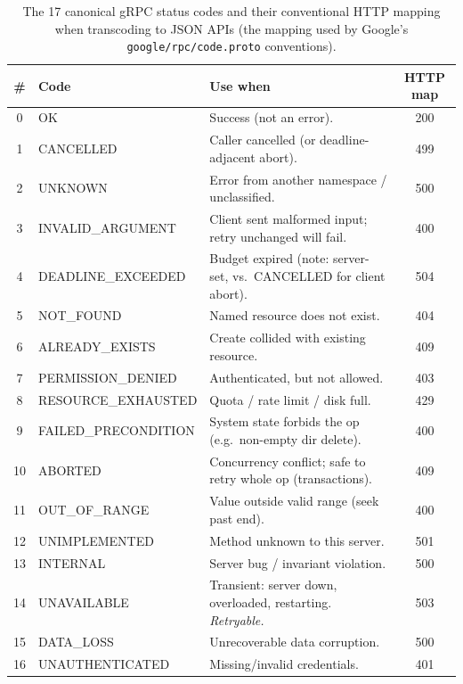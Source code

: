 \begin{table}[htbp]
  \centering
  \small
  \begin{tabularx}{\textwidth}{c l X c}
    \toprule
    \textbf{\#} & \textbf{Code} & \textbf{Use when} & \textbf{HTTP map} \\
    \midrule
    0  & OK & Success (not an error). & 200 \\
    1  & CANCELLED & Caller cancelled (or deadline-adjacent abort). & 499 \\
    2  & UNKNOWN & Error from another namespace / unclassified. & 500 \\
    3  & INVALID\_ARGUMENT & Client sent malformed input; retry unchanged will fail. & 400 \\
    4  & DEADLINE\_EXCEEDED & Budget expired (note: server-set, vs.\ CANCELLED for client abort). & 504 \\
    5  & NOT\_FOUND & Named resource does not exist. & 404 \\
    6  & ALREADY\_EXISTS & Create collided with existing resource. & 409 \\
    7  & PERMISSION\_DENIED & Authenticated, but not allowed. & 403 \\
    8  & RESOURCE\_EXHAUSTED & Quota / rate limit / disk full. & 429 \\
    9  & FAILED\_PRECONDITION & System state forbids the op (e.g.\ non-empty dir delete). & 400 \\
    10 & ABORTED & Concurrency conflict; safe to retry whole op (transactions). & 409 \\
    11 & OUT\_OF\_RANGE & Value outside valid range (seek past end). & 400 \\
    12 & UNIMPLEMENTED & Method unknown to this server. & 501 \\
    13 & INTERNAL & Server bug / invariant violation. & 500 \\
    14 & UNAVAILABLE & Transient: server down, overloaded, restarting. \emph{Retryable.} & 503 \\
    15 & DATA\_LOSS & Unrecoverable data corruption. & 500 \\
    16 & UNAUTHENTICATED & Missing/invalid credentials. & 401 \\
    \bottomrule
  \end{tabularx}
  \caption{The 17 canonical gRPC status codes and their conventional HTTP
  mapping when transcoding to JSON APIs (the mapping used by Google's
  \texttt{google/rpc/code.proto} conventions).}
  \label{tab:ch13-status}
\end{table}

